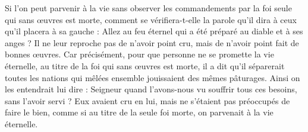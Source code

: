Si l’on peut parvenir à la vie sans observer les commandements par la foi seule qui sans œuvres est morte, comment se vérifiera-t-elle la parole qu’il dira à ceux qu’il placera à sa gauche : Allez au feu éternel qui a été préparé au diable et à ses anges ? Il ne leur reproche pas de n’avoir point cru, mais de n’avoir point fait de bonnes œuvres. Car précisément, pour que personne ne se promette la vie éternelle, au titre de la foi qui sans œuvres est morte, il a dit qu’il séparerait toutes les nations qui mêlées ensemble jouissaient des mêmes pâturages. Ainsi on les entendrait lui dire : Seigneur quand l'avons-nous vu souffrir tous ces besoins, sans l'avoir servi ? Eux avaient cru en lui, mais ne s’étaient pas préoccupés de faire le bien, comme si au titre de la seule foi morte, on parvenait à la vie éternelle.

